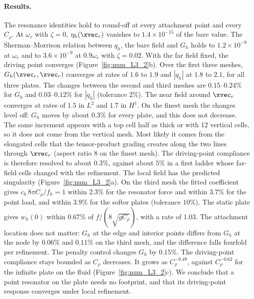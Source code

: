 {\paragraph{Results.} The resonance identities hold to round-off at every attachment point and every $C_\rho$. At $\omega_r$ with $\zeta=0$, $\eta_h(\xvec_r)$ vanishes to $1.4\times10^{-15}$ of the bare value. The Sherman--Morrison relation between $q_h$, the bare field and $G_h$ holds to $1.2\times10^{-9}$ at $\omega_r$ and to $3.6\times10^{-9}$ at $0.9\omega_r$ with $\zeta=0.02$. With the far field fixed, the driving point converges (Figure~\ref{fig:num_L3_2}b). Over the first three meshes, $G_h(\xvec_r,\xvec_r)$ converges at rates of $1.6$ to $1.9$ and $|q_h|$ at $1.8$ to $2.1$, for all three plates. The changes between the second and third meshes are $0.15$--$0.24\%$ for $G_h$ and $0.03$--$0.12\%$ for $|q_h|$ (tolerance $2\%$). The near field around $\xvec_r$ converges at rates of $1.5$ in $L^2$ and $1.7$ in $H^1$. On the finest mesh the changes level off: $G_h$ moves by about $0.3\%$ for every plate, and this does not decrease. The same increment appears with a top cell half as thick or with 12 vertical cells, so it does not come from the vertical mesh. Most likely it comes from the elongated cells that the tensor-product grading creates along the two lines through $\xvec_r$ (aspect ratio $8$ on the finest mesh). The driving-point compliance is therefore resolved to about $0.3\%$, against about $5\%$ in a first ladder whose far-field cells changed with the refinement. The local field has the predicted singularity (Figure~\ref{fig:num_L3_2}a). On the third mesh the fitted coefficient gives $c_h\,8\pi C_\rho/f_h=1$ within $2.3\%$ for the resonator force and within $3.7\%$ for the point load, and within $3.9\%$ for the softer plates (tolerance $10\%$). The static plate gives $w_h(0)$ within $0.67\%$ of $f/(8\sqrt{gC_\rho})$, with a rate of $1.03$. The attachment location does not matter: $G_h$ at the edge and interior points differs from $G_h$ at the node by $0.06\%$ and $0.11\%$ on the third mesh, and the difference falls fourfold per refinement. The penalty control changes $G_h$ by $0.15\%$. The driving-point compliance stays bounded as $C_\rho$ decreases. It grows as $C_\rho^{-0.49}$, against $C_\rho^{-0.62}$ for the infinite plate on the fluid (Figure~\ref{fig:num_L3_2}c). We conclude that a point resonator on the plate needs no footprint, and that its driving-point response converges under local refinement.

}
